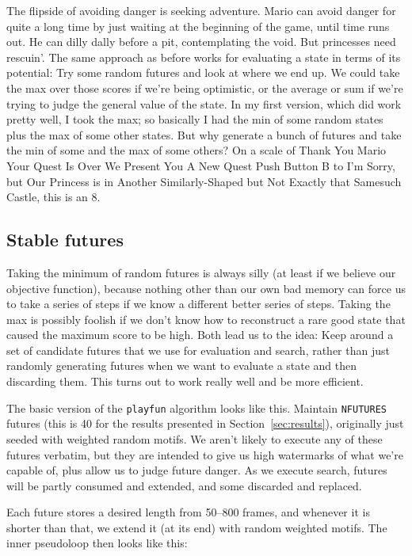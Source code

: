 \documentclass[twocolumn]{article}
\begin{document}
The flipside of avoiding danger is seeking adventure. Mario can avoid
danger for quite a long time by just waiting at the beginning of the
game, until time runs out. He can dilly dally before a pit,
contemplating the void. But princesses need rescuin'. The same
approach as before works for evaluating a state in terms of its
potential: Try some random futures and look at where we end up. We
could take the max over those scores if we're being optimistic, or the
average or sum if we're trying to judge the general value of the
state. In my first version, which did work pretty well, I took the
max; so basically I had the min of some random states plus the max of
some other states. But why generate a bunch of futures and take the
min of some and the max of some others? On a scale of Thank You Mario
Your Quest Is Over We Present You A New Quest Push Button B to I'm
Sorry, but Our Princess is in Another Similarly-Shaped but Not Exactly
that Samesuch Castle, this is an 8.

\subsection{Stable futures}

Taking the minimum of random futures is always silly (at least if we
believe our objective function), because nothing other than our own
bad memory can force us to take a series of steps if we know a
different better series of steps. Taking the max is possibly foolish
if we don't know how to reconstruct a rare good state that caused the
maximum score to be high. Both lead us to the idea: Keep around a set
of candidate futures that we use for evaluation and search, rather
than just randomly generating futures when we want to evaluate a state
and then discarding them. This turns out to work really well and be
more efficient.

The basic version of the {\tt playfun} algorithm looks like this.
Maintain {\tt NFUTURES} futures (this is 40 for the results presented
in Section~\ref{sec:results}), originally just seeded with weighted
random motifs. We aren't likely to execute any of these futures
verbatim, but they are intended to give us high watermarks of what
we're capable of, plus allow us to judge future danger. As we execute
search, futures will be partly consumed and extended, and some discarded
and replaced.

Each future stores a desired length from 50--800 frames, and whenever
it is shorter than that, we extend it (at its end) with random weighted
motifs. The inner pseudoloop then looks like this:
\end{document}
